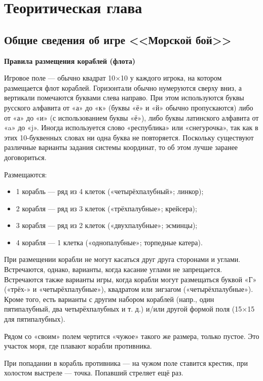 \chapter{\label{ch:ch01}Теоритическая глава} %
\section{\label{sec:ch01/sec01}Общие сведения об игре <<Морской бой>>}
\textbf{Правила размещения кораблей (флота)}

Игровое поле — обычно квадрат 10×10 у каждого игрока, на котором размещается флот кораблей. Горизонтали обычно нумеруются сверху вниз, а вертикали помечаются буквами слева направо. При этом используются буквы русского алфавита от «а» до «к» (буквы «ё» и «й» обычно пропускаются) либо от «а» до «и» (с использованием буквы «ё»), либо буквы латинского алфавита от «a» до «j». Иногда используется слово «республика» или «снегурочка», так как в этих 10-буквенных словах ни одна буква не повторяется. Поскольку существуют различные варианты задания системы координат, то об этом лучше заранее договориться.

Размещаются:
\begin{itemize}
\item 1 корабль — ряд из 4 клеток («четырёхпалубный»; линкор);
\item 2 корабля — ряд из 3 клеток («трёхпалубные»; крейсера);
\item 3 корабля — ряд из 2 клеток («двухпалубные»; эсминцы);
\item 4 корабля — 1 клетка («однопалубные»; торпедные катера).
\end{itemize}

При размещении корабли не могут касаться друг друга сторонами и углами. Встречаются, однако, варианты, когда касание углами не запрещается. Встречаются также варианты игры, когда корабли могут размещаться буквой «Г» («трёх-» и «четырёхпалубные»), квадратом или зигзагом («четырёхпалубные»). Кроме того, есть варианты с другим набором кораблей (напр., один пятипалубный, два четырёхпалубных и т. д.) и/или другой формой поля (15×15 для пятипалубных).

Рядом со «своим» полем чертится «чужое» такого же размера, только пустое. Это участок моря, где плавают корабли противника.

При попадании в корабль противника — на чужом поле ставится крестик, при холостом выстреле — точка. Попавший стреляет ещё раз.

